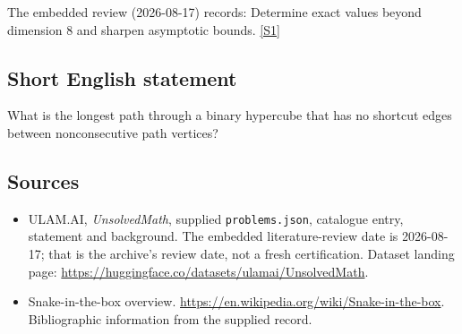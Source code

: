 \documentclass[11pt,a4paper]{article}
\newcommand{\sref}[2]{\hyperlink{source:#1:#2}{[S#2]}}
\begin{document}
The embedded review (2026-08-17) records: Determine exact values beyond dimension 8 and sharpen asymptotic bounds. \sref{statement}{1}

\subsection{Short English statement}

What is the longest path through a binary hypercube that has no shortcut edges between nonconsecutive path vertices?

\subsection{Sources}

{\small

\begin{itemize}

\item[\hypertarget{source:statement:1}{S1}] ULAM.AI, \emph{UnsolvedMath}, supplied \texttt{problems.json}, catalogue entry, statement and background. The embedded literature-review date is 2026-08-17; that is the archive’s review date, not a fresh certification. Dataset landing page: \url{https://huggingface.co/datasets/ulamai/UnsolvedMath}.

\item[\hypertarget{source:statement:2}{S2}] Snake-in-the-box overview. \url{https://en.wikipedia.org/wiki/Snake-in-the-box}. Bibliographic information from the supplied record.

\end{itemize}

}

\label{end:statement}
\end{document}
